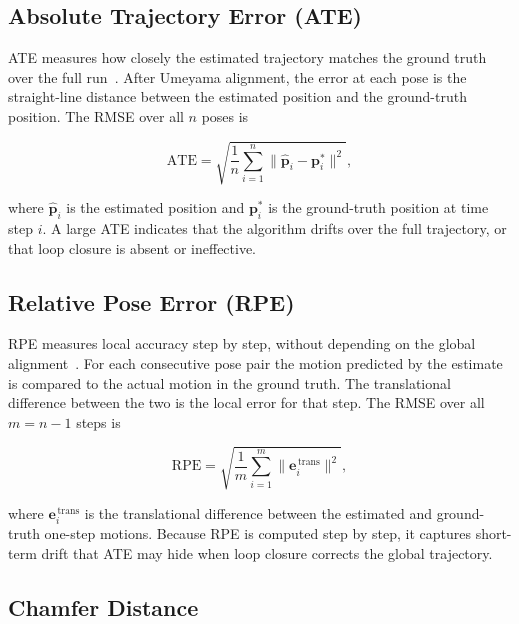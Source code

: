 \subsection{Absolute Trajectory Error (ATE)}

ATE measures how closely the estimated trajectory matches the ground truth
over the full run~\cite{sturm2012benchmark}.
After Umeyama alignment, the error at each pose is the straight-line distance
between the estimated position and the ground-truth position.
The RMSE over all $n$ poses is

\begin{equation}
  \text{ATE} = \sqrt{\frac{1}{n}\sum_{i=1}^{n}
               \lVert \hat{\mathbf{p}}_i - \mathbf{p}_i^* \rVert^2},
  \label{eq:ate}
\end{equation}

\noindent where $\hat{\mathbf{p}}_i$ is the estimated position and
$\mathbf{p}_i^*$ is the ground-truth position at time step $i$.
A large ATE indicates that the algorithm drifts over the full trajectory,
or that loop closure is absent or ineffective.

\subsection{Relative Pose Error (RPE)}

RPE measures local accuracy step by step, without depending on the global
alignment~\cite{sturm2012benchmark}.
For each consecutive pose pair the motion predicted by the estimate is
compared to the actual motion in the ground truth.
The translational difference between the two is the local error for that step.
The RMSE over all $m = n-1$ steps is

\begin{equation}
  \text{RPE} = \sqrt{\frac{1}{m}\sum_{i=1}^{m}
               \lVert \mathbf{e}_{i}^{\,\text{trans}} \rVert^2},
  \label{eq:rpe}
\end{equation}

\noindent where $\mathbf{e}_{i}^{\,\text{trans}}$ is the translational
difference between the estimated and ground-truth one-step motions.
Because RPE is computed step by step, it captures short-term drift that
ATE may hide when loop closure corrects the global trajectory.

\subsection{Chamfer Distance}

